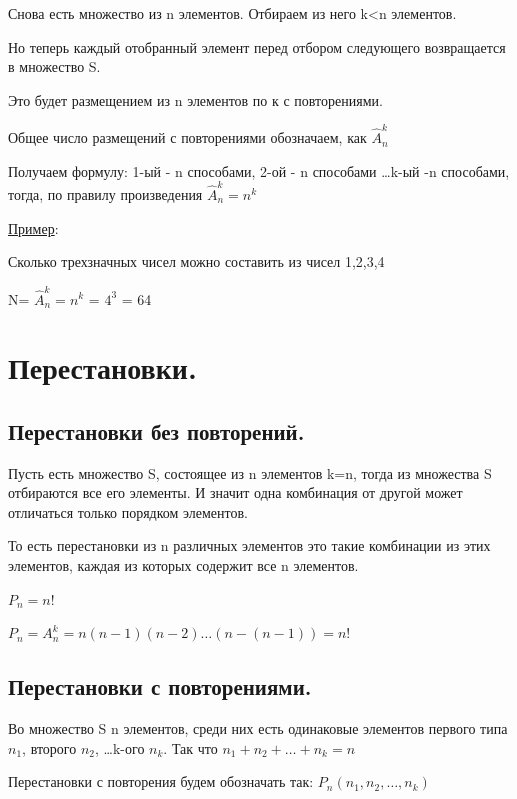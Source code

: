 \documentclass[12pt, a4paper, oneside]{article}
\theoremstyle{plain} %
\theoremstyle{definition}
\begin{document}
Снова есть множество из n элементов. Отбираем из него k<n элементов. 

Но теперь каждый отобранный элемент перед отбором следующего возвращается в множество S. 

Это будет размещением из n элементов по к с повторениями.



Общее число размещений с повторениями обозначаем, как $\hat{A}_n^k$

Получаем формулу: 1-ый - n способами, 2-ой - n  способами \dots k-ый -n способами, тогда, по правилу произведения  $\hat{A}_n^k = n^k$

\underline{Пример}:

Сколько трехзначных чисел можно составить из чисел 1,2,3,4



N= $\hat{A}_n^k = n^k$ = $4^3$ = 64

\section{Перестановки.}



\subsection{Перестановки без повторений.}

Пусть есть множество S, состоящее из n элементов k=n, тогда из множества S отбираются все его элементы. И значит одна комбинация от другой  может отличаться только порядком элементов.

То есть перестановки из n различных элементов это такие комбинации из этих элементов, каждая из которых содержит все n элементов.

$P_n=n!$


$P_n = A_n^k = n(n-1)(n-2)\dots(n-(n-1)) = n!$

\subsection{Перестановки с повторениями.}

Во множество S n элементов, среди них есть одинаковые элементов первого типа $n_1$, второго $n_2$, \dots k-ого $n_k$. Так что $n_1+n_2+\dots +n_k=n$

Перестановки с повторения будем обозначать так: $P_n(n_1,n_2,\dots ,n_k)$
\end{document}
